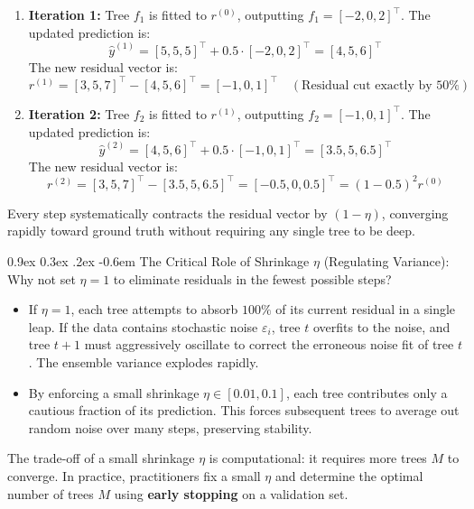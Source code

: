 \documentclass[11pt,a4paper]{article}
\makeatletter
\renewcommand\paragraph{\@startsection{paragraph}{4}{\z@}%
                                     {0.9ex \@plus0.3ex \@minus.2ex}%
                                     {-0.6em}%
                                     {\normalfont\normalsize\bfseries}}
\makeatother
\begin{document}
\begin{enumerate}
    \item \textbf{Iteration 1:} Tree $f_1$ is fitted to $r^{(0)}$, outputting $f_1 = [-2, 0, 2]^\top$. The updated prediction is:
    \begin{equation*}
        \hat{y}^{(1)} = [5, 5, 5]^\top + 0.5 \cdot [-2, 0, 2]^\top = [4, 5, 6]^\top
    \end{equation*}
    The new residual vector is:
    \begin{equation*}
        r^{(1)} = [3, 5, 7]^\top - [4, 5, 6]^\top = [-1, 0, 1]^\top \quad (\text{Residual cut exactly by } 50\%)
    \end{equation*}
    \item \textbf{Iteration 2:} Tree $f_2$ is fitted to $r^{(1)}$, outputting $f_2 = [-1, 0, 1]^\top$. The updated prediction is:
    \begin{equation*}
        \hat{y}^{(2)} = [4, 5, 6]^\top + 0.5 \cdot [-1, 0, 1]^\top = [3.5, 5, 6.5]^\top
    \end{equation*}
    The new residual vector is:
    \begin{equation*}
        r^{(2)} = [3, 5, 7]^\top - [3.5, 5, 6.5]^\top = [-0.5, 0, 0.5]^\top = (1 - 0.5)^2 r^{(0)}
    \end{equation*}
\end{enumerate}
Every step systematically contracts the residual vector by $(1 - \eta)$, converging rapidly toward ground truth without requiring any single tree to be deep.

\paragraph{The Critical Role of Shrinkage $\eta$ (Regulating Variance):}
Why not set $\eta = 1$ to eliminate residuals in the fewest possible steps?
\begin{itemize}
    \item If $\eta = 1$, each tree attempts to absorb $100\%$ of its current residual in a single leap. If the data contains stochastic noise $\varepsilon_i$, tree $t$ overfits to the noise, and tree $t+1$ must aggressively oscillate to correct the erroneous noise fit of tree $t$. The ensemble variance explodes rapidly.
    \item By enforcing a small shrinkage $\eta \in [0.01, 0.1]$, each tree contributes only a cautious fraction of its prediction. This forces subsequent trees to average out random noise over many steps, preserving stability.
\end{itemize}
The trade-off of a small shrinkage $\eta$ is computational: it requires more trees $M$ to converge. In practice, practitioners fix a small $\eta$ and determine the optimal number of trees $M$ using \textbf{early stopping} on a validation set.
\end{document}
